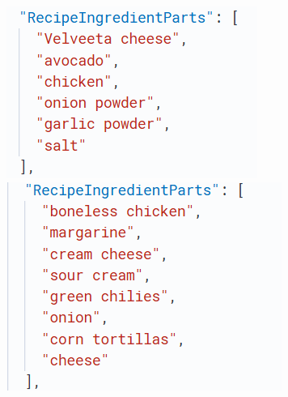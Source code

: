 \begin{enumerate}
    \begin{figure}[h!]
    \centering
    \begin{minipage}{0.25\textwidth}
        \centering
        \includegraphics[width=\textwidth]{Report/ReportLatex/Images/ElasticsearchResults/ingredients2.png}
    \end{minipage}%
    \hspace{0.05\textwidth}
    \begin{minipage}{0.25\textwidth}
        \centering
        \includegraphics[width=\textwidth]{Report/ReportLatex/Images/ElasticsearchResults/ingredients3.png}
    \end{minipage}%
    \hspace{0.05\textwidth}
    \begin{minipage}{0.25\textwidth}

\end{minipage}
\end{figure}
\end{enumerate}
